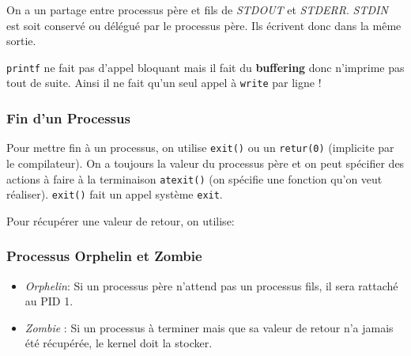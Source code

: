 On a un partage entre processus père et fils de \emph{STDOUT} et
\emph{STDERR}. \emph{STDIN} est soit conservé ou délégué par le
processus père. Ils écrivent donc dans la même sortie.

\texttt{printf} ne fait pas d'appel bloquant mais il fait du
\textbf{buffering} donc n'imprime pas tout de suite. Ainsi il ne fait
qu'un seul appel à \texttt{write} par ligne !

\subsubsection{Fin d'un Processus}\label{fin-dun-processus}

Pour mettre fin à un processus, on utilise \texttt{exit()} ou un
\texttt{retur(0)} (implicite par le compilateur). On a toujours la
valeur du processus père et on peut spécifier des actions à faire à la
terminaison \texttt{atexit()} (on spécifie une fonction qu'on veut
réaliser). \texttt{exit()} fait un appel système \texttt{exit}.

Pour récupérer une valeur de retour, on utilise:

\begin{Shaded}
\begin{Highlighting}[]
\PreprocessorTok{ }

\OperatorTok{(}\OperatorTok{,}  \OperatorTok{*}\OperatorTok{,} \OperatorTok{);}
\end{Highlighting}
\end{Shaded}

\subsubsection{Processus Orphelin et
Zombie}\label{processus-orphelin-et-zombie}

\begin{itemize}
\tightlist
\item
  \emph{Orphelin}: Si un processus père n'attend pas un processus fils,
  il sera rattaché au PID 1.
\item
  \emph{Zombie} : Si un processus à terminer mais que sa valeur de
  retour n'a jamais été récupérée, le kernel doit la stocker.
\end{itemize}

